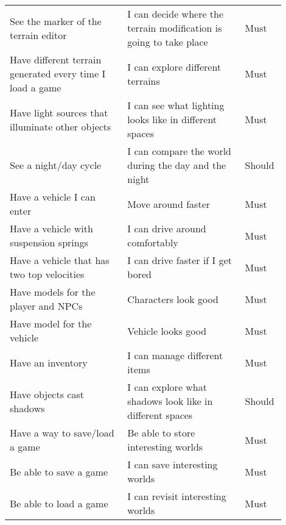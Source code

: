 \documentclass[12pt]{article}
\begin{document}
\begin{table}[H]
\begin{tabular}{p{0.4\linewidth}|p{0.4\linewidth}|p{0.1\linewidth}}
        See the marker of the terrain editor                      & I can decide where the terrain modification is going to take place & Must           \\
        Have different terrain generated every time I load a game & I can explore different terrains                                   & Must           \\
        Have light sources that illuminate other objects          & I can see what lighting looks like in different spaces             & Must           \\
        See a night/day cycle                                     & I can compare the world during the day and the night               & Should         \\
        Have a vehicle I can enter                                & Move around faster                                                 & Must           \\
        Have a vehicle with suspension springs                    & I can drive around comfortably                                     & Must           \\
        Have a vehicle that has two top velocities                & I can drive faster if I get bored                                  & Must           \\
        Have models for the player and NPCs                       & Characters look good                                               & Must           \\
        Have model for the vehicle                                & Vehicle looks good                                                 & Must           \\
        Have an inventory                                         & I can manage different items                                       & Must           \\
        Have objects cast shadows                                 & I can explore what shadows look like in different spaces           & Should         \\
        Have a way to save/load a game                            & Be able to store interesting worlds                                & Must           \\
        Be able to save a game                                    & I can save interesting worlds                                      & Must           \\
        Be able to load a game                                    & I can revisit interesting worlds                                   & Must           \\

\end{tabular}
\end{table}
\end{document}
